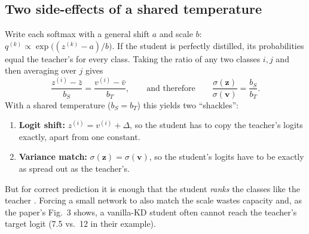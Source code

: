 \documentclass[12pt,a4paper]{article}
\begin{document}
\subsection{Two side-effects of a shared temperature}
Write each softmax with a general shift $a$ and scale $b$: $q^{(k)}\propto\exp\big((z^{(k)}-a)/b\big)$. If the student is perfectly distilled, its probabilities equal the teacher's for every class. Taking the ratio of any two classes $i,j$ and then averaging over $j$ gives
\begin{equation}
\frac{z^{(i)}-\bar z}{b_S}=\frac{v^{(i)}-\bar v}{b_T},
\qquad\text{and therefore}\qquad
\frac{\sigma(\mathbf{z})}{\sigma(\mathbf{v})}=\frac{b_S}{b_T}.
\label{eq:shackles}
\end{equation}
With a shared temperature ($b_S=b_T$) this yields two ``shackles'':
\begin{enumerate}[nosep]
\item \textbf{Logit shift:} $z^{(i)}=v^{(i)}+\Delta$, so the student has to copy the teacher's logits exactly, apart from one constant.
\item \textbf{Variance match:} $\sigma(\mathbf{z})=\sigma(\mathbf{v})$, so the student's logits have to be exactly as spread out as the teacher's.
\end{enumerate}
But for correct prediction it is enough that the student \emph{ranks} the classes like the teacher \cite{huang2022}. Forcing a small network to also match the scale wastes capacity and, as the paper's Fig.~3 shows, a vanilla-KD student often cannot reach the teacher's target logit (7.5 vs.\ 12 in their example).
\end{document}
